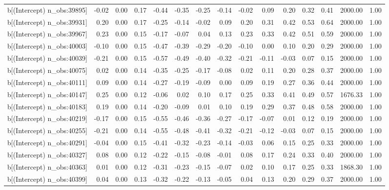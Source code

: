 \begin{table}[ht]
\begin{tabular}{rrrrrrrrrrrrrrr}
  b[(Intercept) n\_obs:39895] & -0.02 & 0.00 & 0.17 & -0.44 & -0.35 & -0.25 & -0.14 & -0.02 & 0.09 & 0.20 & 0.32 & 0.41 & 2000.00 & 1.00 \\ 
  b[(Intercept) n\_obs:39931] & 0.20 & 0.00 & 0.17 & -0.25 & -0.14 & -0.02 & 0.09 & 0.20 & 0.31 & 0.42 & 0.53 & 0.64 & 2000.00 & 1.00 \\ 
  b[(Intercept) n\_obs:39967] & 0.23 & 0.00 & 0.15 & -0.17 & -0.07 & 0.04 & 0.13 & 0.23 & 0.33 & 0.42 & 0.51 & 0.59 & 2000.00 & 1.00 \\ 
  b[(Intercept) n\_obs:40003] & -0.10 & 0.00 & 0.15 & -0.47 & -0.39 & -0.29 & -0.20 & -0.10 & 0.00 & 0.10 & 0.20 & 0.29 & 2000.00 & 1.00 \\ 
  b[(Intercept) n\_obs:40039] & -0.21 & 0.00 & 0.15 & -0.57 & -0.49 & -0.40 & -0.32 & -0.21 & -0.11 & -0.03 & 0.07 & 0.15 & 2000.00 & 1.00 \\ 
  b[(Intercept) n\_obs:40075] & 0.02 & 0.00 & 0.14 & -0.35 & -0.25 & -0.17 & -0.08 & 0.02 & 0.11 & 0.20 & 0.28 & 0.37 & 2000.00 & 1.00 \\ 
  b[(Intercept) n\_obs:40111] & 0.09 & 0.00 & 0.14 & -0.27 & -0.19 & -0.09 & 0.00 & 0.09 & 0.19 & 0.27 & 0.36 & 0.44 & 2000.00 & 1.00 \\ 
  b[(Intercept) n\_obs:40147] & 0.25 & 0.00 & 0.12 & -0.06 & 0.02 & 0.10 & 0.17 & 0.25 & 0.33 & 0.41 & 0.49 & 0.57 & 1676.33 & 1.00 \\ 
  b[(Intercept) n\_obs:40183] & 0.19 & 0.00 & 0.14 & -0.20 & -0.09 & 0.01 & 0.10 & 0.19 & 0.29 & 0.37 & 0.48 & 0.58 & 2000.00 & 1.00 \\ 
  b[(Intercept) n\_obs:40219] & -0.17 & 0.00 & 0.15 & -0.55 & -0.46 & -0.36 & -0.27 & -0.17 & -0.07 & 0.01 & 0.12 & 0.19 & 2000.00 & 1.00 \\ 
  b[(Intercept) n\_obs:40255] & -0.21 & 0.00 & 0.14 & -0.55 & -0.48 & -0.41 & -0.32 & -0.21 & -0.12 & -0.03 & 0.07 & 0.15 & 2000.00 & 1.00 \\ 
  b[(Intercept) n\_obs:40291] & -0.04 & 0.00 & 0.15 & -0.41 & -0.32 & -0.23 & -0.14 & -0.03 & 0.06 & 0.15 & 0.25 & 0.33 & 2000.00 & 1.00 \\ 
  b[(Intercept) n\_obs:40327] & 0.08 & 0.00 & 0.12 & -0.22 & -0.15 & -0.08 & -0.01 & 0.08 & 0.17 & 0.24 & 0.33 & 0.40 & 2000.00 & 1.00 \\ 
  b[(Intercept) n\_obs:40363] & 0.01 & 0.00 & 0.12 & -0.31 & -0.23 & -0.15 & -0.07 & 0.02 & 0.10 & 0.17 & 0.25 & 0.33 & 1868.30 & 1.00 \\ 
  b[(Intercept) n\_obs:40399] & 0.04 & 0.00 & 0.13 & -0.32 & -0.22 & -0.13 & -0.05 & 0.04 & 0.13 & 0.20 & 0.29 & 0.37 & 2000.00 & 1.00 \\ 

\end{tabular}
\end{table}
